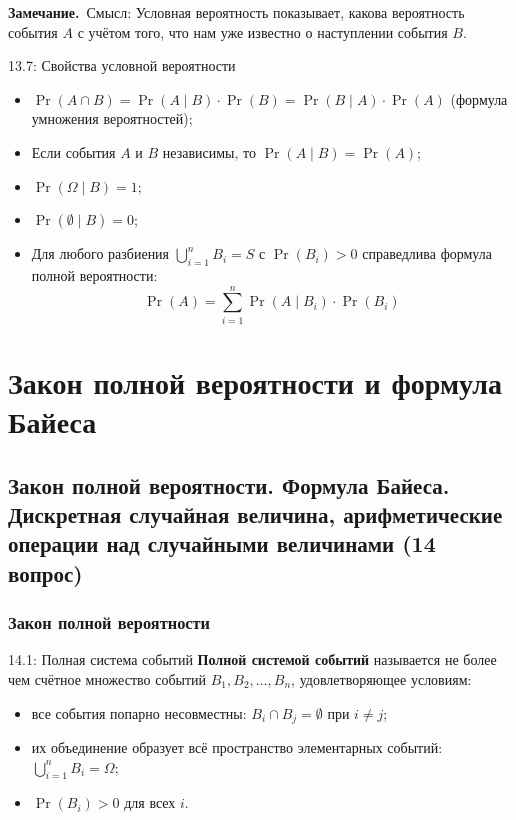 \documentclass[a4paper,12pt]{article}
\newcommand{\myremark}{\textbf{Замечание.}\ }
\begin{document}
	\myremark{Смысл:} Условная вероятность показывает, какова вероятность события \(A\) с учётом того, что нам уже известно о наступлении события \(B\).
	
	\begin{propertybox}{13.7: Свойства условной вероятности}
		\begin{itemize}
			\item \(\Pr(A \cap B) = \Pr(A \mid B) \cdot \Pr(B) = \Pr(B \mid A) \cdot \Pr(A)\) (формула умножения вероятностей);
			\item Если события \(A\) и \(B\) независимы, то \(\Pr(A \mid B) = \Pr(A)\);
			\item \(\Pr(\Omega \mid B) = 1\);
			\item \(\Pr(\emptyset \mid B) = 0\);
			\item Для любого разбиения \(\bigcup_{i=1}^n B_i = S\) с \(\Pr(B_i) > 0\) справедлива формула полной вероятности:
			\[ \Pr(A) = \sum_{i=1}^n \Pr(A \mid B_i) \cdot \Pr(B_i) \]
		\end{itemize}
	\end{propertybox}
	
	
	
	
	
	
	
	
	
	
	\newpage
	\section{Закон полной вероятности и формула Байеса}
	
	\subsection{Закон полной вероятности. Формула Байеса. Дискретная случайная величина, арифметические операции над случайными величинами (14 вопрос)}
	
	\subsubsection{Закон полной вероятности}
	
	\begin{definitionbox}{14.1: Полная система событий}
		\textbf{Полной системой событий} называется не более чем счётное множество событий \(B_1, B_2, \dots, B_n\), удовлетворяющее условиям:
		\begin{itemize}
			\item все события попарно несовместны: \(B_i \cap B_j = \emptyset\) при \(i \neq j\);
			\item их объединение образует всё пространство элементарных событий: \(\bigcup_{i=1}^n B_i = \Omega\);
			\item \(\Pr(B_i) > 0\) для всех \(i\).
		\end{itemize}
	\end{definitionbox}
	
\end{document}
